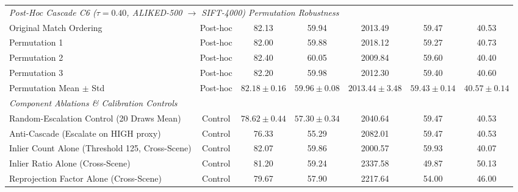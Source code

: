 \begin{table}[t]
\begin{tabular}{lcccccc}
\hline
\multicolumn{7}{l}{\textit{Post-Hoc Cascade C6 ($\tau=0.40$, ALIKED-500 $\to$ SIFT-4000) Permutation Robustness}} \\
Original Match Ordering & Post-hoc & 82.13 & 59.94 & 2013.49 & 59.47 & 40.53 \\
Permutation 1 & Post-hoc & 82.00 & 59.88 & 2018.12 & 59.27 & 40.73 \\
Permutation 2 & Post-hoc & 82.40 & 60.05 & 2009.84 & 59.60 & 40.40 \\
Permutation 3 & Post-hoc & 82.20 & 59.98 & 2012.30 & 59.40 & 40.60 \\
Permutation Mean $\pm$ Std & Post-hoc & $82.18 \pm 0.16$ & $59.96 \pm 0.08$ & $2013.44 \pm 3.48$ & $59.43 \pm 0.14$ & $40.57 \pm 0.14$ \\
\hline
\multicolumn{7}{l}{\textit{Component Ablations \& Calibration Controls}} \\
Random-Escalation Control (20 Draws Mean) & Control & $78.62 \pm 0.44$ & $57.30 \pm 0.34$ & 2040.64 & 59.47 & 40.53 \\
Anti-Cascade (Escalate on HIGH proxy) & Control & 76.33 & 55.29 & 2082.01 & 59.47 & 40.53 \\
Inlier Count Alone (Threshold 125, Cross-Scene) & Control & 82.07 & 59.86 & 2000.57 & 59.93 & 40.07 \\
Inlier Ratio Alone (Cross-Scene) & Control & 81.20 & 59.24 & 2337.58 & 49.87 & 50.13 \\
Reprojection Factor Alone (Cross-Scene) & Control & 79.67 & 57.90 & 2217.64 & 54.00 & 46.00 \\
\hline
\end{tabular}
\end{table}
